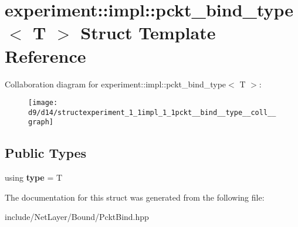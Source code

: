 \hypertarget{structexperiment_1_1impl_1_1pckt__bind__type}{}\section{experiment\+:\+:impl\+:\+:pckt\+\_\+bind\+\_\+type$<$ T $>$ Struct Template Reference}
\label{structexperiment_1_1impl_1_1pckt__bind__type}


Collaboration diagram for experiment\+:\+:impl\+:\+:pckt\+\_\+bind\+\_\+type$<$ T $>$\+:\nopagebreak
\begin{figure}[H]
\begin{center}
\leavevmode
\texttt{[image: d9/d14/structexperiment\_1\_1impl\_1\_1pckt\_\_bind\_\_type\_\_coll\_\_graph]}
\end{center}
\end{figure}
\subsection*{Public Types}
\begin{DoxyCompactItemize}
\item 
\hypertarget{structexperiment_1_1impl_1_1pckt__bind__type_a29ef06f11cc6f45c50ead44f7cf0cfb5}{}using {\bfseries type} = T\label{structexperiment_1_1impl_1_1pckt__bind__type_a29ef06f11cc6f45c50ead44f7cf0cfb5}

\end{DoxyCompactItemize}


The documentation for this struct was generated from the following file\+:\begin{DoxyCompactItemize}
\item 
include/\+Net\+Layer/\+Bound/Pckt\+Bind.\+hpp\end{DoxyCompactItemize}
